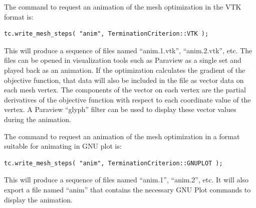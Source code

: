 The command to request an animation of the mesh optimization in the VTK format is:
\begin{lstlisting}
tc.write_mesh_steps( "anim", TerminationCriterion::VTK );
\end{lstlisting}
This will produce a sequence of files named ``anim.1.vtk'', ``anim.2.vtk'', etc.  The files can be opened in visualization tools such as Paraview as a single set and played back as an animation.  If the optimization calculates the gradient of the objective function, that data will also be included in the file as vector data on each mesh vertex.  The components of the vector on each vertex are the partial derivatives of the objective function with respect to each coordinate value of the vertex.  A Paraview ``glyph'' filter can be used to display these vector values during the animation.


The command to request an animation of the mesh optimization in a format suitable for animating in GNU plot is:
\begin{lstlisting}
tc.write_mesh_steps( "anim", TerminationCriterion::GNUPLOT );
\end{lstlisting}
This will produce a sequence of files named ``anim.1'', ``anim.2'', etc.  It will also export a file named ``anim'' that contains the necessary GNU Plot commands to display the animation.

